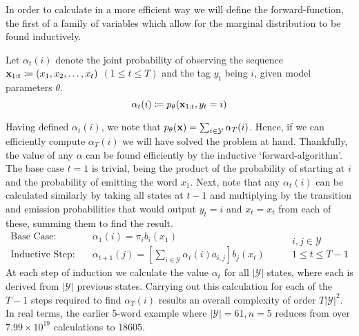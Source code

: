 \documentclass[../main.tex]{subfiles}
\begin{document}
In order to calculate in a more efficient way we will define the forward-function, the first of a family of variables which allow for the marginal distribution to be found inductively.
\begin{definition} \label{def:forward-func}
    Let $\alpha_t(i)$ denote the joint probability of observing the sequence $\mathbf{x}_{1:t} \coloneqq (x_1,x_2,\ldots,x_t)$ $(1 \leq t \leq T)$ and the tag $y_t$ being $i$, given model parameters $\theta$.
    \begin{equation*}
        \alpha_t(i) \coloneqq p_\theta(\mathbf{x}_{1:t},y_t=i)
    \end{equation*}
\end{definition}
Having defined $\alpha_t(i)$, we note that $p_\theta(\mathbf{x}) = \sum_{i \in \mathcal{Y}} \alpha_T(i)$.
Hence, if we can efficiently compute $\alpha_T(i)$ we will have solved the problem at hand.
Thankfully, the value of any $\alpha$ can be found efficiently by the inductive `forward-algorithm'. The base case $t=1$ is trivial, being the product of the probability of starting at $i$ and the probability of emitting the word $x_1$. Next, note that any $\alpha_t(i)$ can be calculated similarly by taking all states at $t-1$ and multiplying by the transition and emission probabilities that would output $y_{t}=i$ and $x_{t} = x_t$ from each of these, summing them to find the result.
\begin{equation*}
    \begin{aligned}
        \text{Base Case:} & \quad \alpha_1(i) = \pi_{i} b_i(x_1) \\
        \text{Inductive Step:} & \quad \alpha_{t+1}(j) = \left[ \sum_{i \in \mathcal{Y}} \alpha_{t}(i)a_{i,j} \right] b_j(x_t)
    \end{aligned} \qquad 
        \begin{array}{lr}
            i,j \in \mathcal{Y} \\
            1 \leq t \leq T-1
        \end{array}
\end{equation*}
At each step of induction we calculate the value $\alpha_t$ for all $|\mathcal{Y}|$ states, where each is derived from $|\mathcal{Y}|$ previous states.
Carrying out this calculation for each of the $T-1$ steps required to find $\alpha_T(i)$ results an overall complexity of order $T|\mathcal{Y}|^2$.
In real terms, the earlier 5-word example where $|\mathcal{Y}|=61,n=5$ reduces from over $7.99 \times 10^{19}$ calculations to $18605$.
\end{document}
